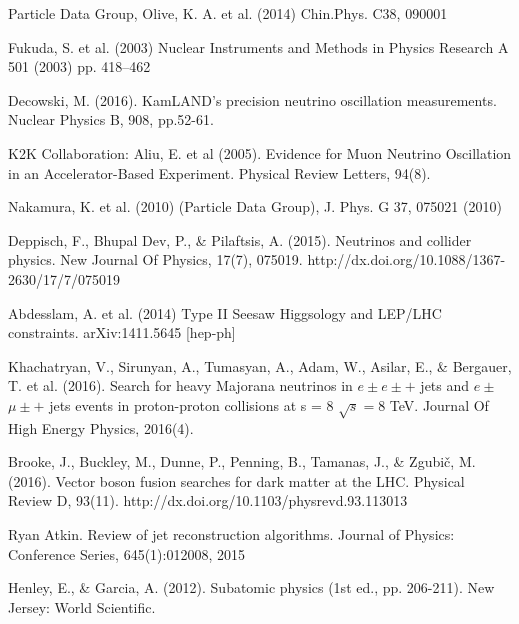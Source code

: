 \documentclass[11pt, oneside]{book}
\begin{document}
\backmatter
%

%
%


\begin{thebibliography}{10}

Particle Data Group, Olive, K. A. et al. (2014) Chin.Phys. C38, 090001 


 Fukuda, S. et al. (2003) Nuclear Instruments and Methods in Physics Research A 501 (2003) pp. 418–462

 Decowski, M. (2016). KamLAND's precision neutrino oscillation measurements. Nuclear Physics B, 908, pp.52-61.

 K2K Collaboration: Aliu, E. et al (2005). Evidence for Muon Neutrino Oscillation in an Accelerator-Based Experiment. Physical Review Letters, 94(8).

Nakamura, K. et al. (2010) (Particle Data Group), J. Phys. G 37, 075021 (2010) 

 Deppisch, F., Bhupal Dev, P., \& Pilaftsis, A. (2015). Neutrinos and collider physics. New Journal Of Physics, 17(7), 075019. http://dx.doi.org/10.1088/1367-2630/17/7/075019

 Abdesslam, A. et al. (2014) Type II Seesaw Higgsology and LEP/LHC constraints. arXiv:1411.5645 [hep-ph]

 Khachatryan, V., Sirunyan, A., Tumasyan, A., Adam, W., Asilar, E., \& Bergauer, T. et al. (2016). Search for heavy Majorana neutrinos in $e\pm e\pm +$ jets and $e\pm$ $\mu \pm +$ jets events in proton-proton collisions at s = 8 $\sqrt{s}=8$ TeV. Journal Of High Energy Physics, 2016(4).

 Brooke, J., Buckley, M., Dunne, P., Penning, B., Tamanas, J., \& Zgubič, M. (2016). Vector boson fusion searches for dark matter at the LHC. Physical Review D, 93(11). http://dx.doi.org/10.1103/physrevd.93.113013

 Ryan Atkin.  Review of jet reconstruction algorithms. Journal of Physics: Conference Series, 645(1):012008, 2015

 Henley, E., \& Garcia, A. (2012). Subatomic physics (1st ed., pp. 206-211). New Jersey: World Scientific.


\end{thebibliography}
\end{document}

